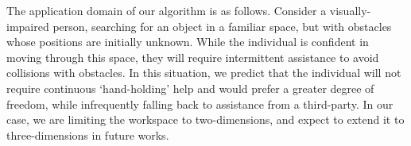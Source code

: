 The application domain of our algorithm is as follows. 
Consider a visually-impaired person, searching for an object in a familiar space, but with obstacles whose positions are initially unknown. 
While the individual is confident in moving through this space, they will require intermittent assistance to avoid collisions with obstacles. 
In this situation, we predict that the individual will not require continuous `hand-holding' help and would prefer a greater degree of freedom, while infrequently falling back to assistance from a third-party. 
In our case, we are limiting the workspace to two-dimensions, and expect to extend it to three-dimensions in future works. 
